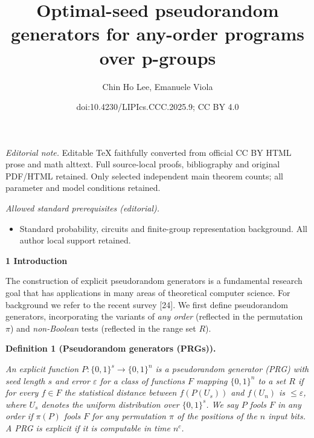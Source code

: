\documentclass[10pt,a4paper]{article}
\title{Optimal-seed pseudorandom generators for any-order programs over p-groups}
\author{Chin Ho Lee, Emanuele Viola}
\date{doi:10.4230/LIPIcs.CCC.2025.9; CC BY 4.0}
\begin{document}
\maketitle
\noindent\textit{Editorial note.} Editable TeX faithfully converted from official CC BY HTML prose and math alttext. Full source-local proofs, bibliography and original PDF/HTML retained. Only selected independent main theorem counts; all parameter and model conditions retained.\par\medskip
\noindent\textit{Allowed standard prerequisites (editorial).}\begin{itemize}
\item Standard probability, circuits and finite-group representation background. All author local support retained.
\end{itemize}\medskip


\par\medskip\noindent\textbf{
1 Introduction}\par




The construction of explicit pseudorandom generators is a fundamental research
goal that has applications in many areas of theoretical computer science.
For background we refer to the recent survey [24].
We first define pseudorandom generators, incorporating the variants
of \emph{any order} (reflected in the permutation $\pi$) and \emph{non-Boolean} tests (reflected in the
range set $R$).\par





\par\medskip\noindent\textbf{
\textbf{Definition 1}\textbf{ }(Pseudorandom generators (PRGs))\textbf{.}
}\par



\emph{An explicit function $P\colon\{0,1\}^{s}\to\{0,1\}^{n}$ is a pseudorandom
generator (PRG) with seed length $s$ and error $\varepsilon$ for a class
of functions $F$ mapping $\{0,1\}^{n}$ to a set $R$ if for every $f\in F$ the
statistical distance between $f(P(U_{s}))$ and $f(U_{n})$ is $\leq\varepsilon$,
where $U_{s}$ denotes the uniform distribution over $\{0,1\}^{s}$. We say $P$ fools $F$ in any order if $\pi(P)$ fools $F$
for any permutation $\pi$ of the positions of the $n$ input bits.
A PRG is explicit if it is computable in time $n^{c}$.}\par
\end{document}
